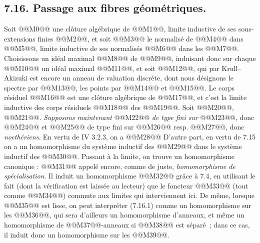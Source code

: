 
\subsection*{7.16. Passage aux fibres géométriques.}
Soit @@M0@@ une clôture algébrique de @@M1@@, limite inductive de ses sous-extensions finies @@M2@@, et soit @@M3@@ le normalisé de @@M4@@ dans @@M5@@, limite inductive de ses normalisés @@M6@@ dans les @@M7@@. Choisissons un idéal maximal @@M8@@ de @@M9@@, induisant donc sur chaque @@M10@@ un idéal maximal @@M11@@, et soit @@M12@@, qui par Krull--Akizuki est encore un anneau de valuation discrète, dont nous désignons le spectre par @@M13@@, les points par @@M14@@ et @@M15@@. Le corps résiduel @@M16@@ est une clôture algébrique de @@M17@@, et c'est la limite inductive des corps résiduels @@M18@@ des @@M19@@. Soit @@M20@@, @@M21@@. \emph{Supposons maintenant} @@M22@@ \emph{de type fini sur} @@M23@@, donc @@M24@@ et @@M25@@ de type fini sur @@M26@@ resp. @@M27@@, donc \emph{noethériens}. En vertu de IV 3.2.3, on a
@@M28@@
D'autre part, en vertu de 7.15 on a un homomorphisme du système inductif des @@M29@@ dans le système inductif des @@M30@@. Passant à la limite, on trouve un homomorphisme canonique :
@@M31@@
appelé encore, comme de juste, \emph{homomorphisme de spécialisation}. Il induit un homomorphisme @@M32@@ grâce à 7.4, en utilisant le fait (dont la vérification est laissée au lecteur) que le foncteur @@M33@@ (tout comme @@M34@@) commute aux limites qui interviennent ici. De même, lorsque @@M35@@ est lisse, on peut interpréter (7.16.1) comme un homomorphisme sur les @@M36@@, qui sera d'ailleurs un homomorphisme d'anneaux, et même un homomorphisme de @@M37@@-anneaux si @@M38@@ est séparé~; dans ce cas, il induit donc un homomorphisme sur les @@M39@@.


